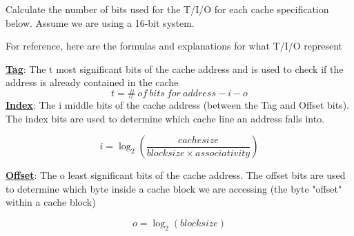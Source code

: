 \begin{blocksection}
\question
Calculate the number of bits used for the T/I/O for each cache specification below. Assume we are using a 16-bit system.

For reference, here are the formulas and explanations for what T/I/O represent

\textbf{\underline{Tag}}: The t most significant bits of the cache address and is used to check if the address is already contained in the cache 
\[
t = \# \: of \: bits \: for \: address - i - o
\]
\textbf{\underline{Index}}: The i middle bits of the cache address (between the Tag and Offset bits). The index bits are used to determine which cache line an address falls into.

\[
i = \log _{2} (\frac{cache size}{block size \times associativity})
\]

\textbf{\underline{Offset}}: The o least significant bits of the cache address. The offset bits are used to determine which byte inside a cache block we are accessing (the byte "offset" within a cache block)

\[
o = \log _{2} (block size)
\]



\end{blocksection}
